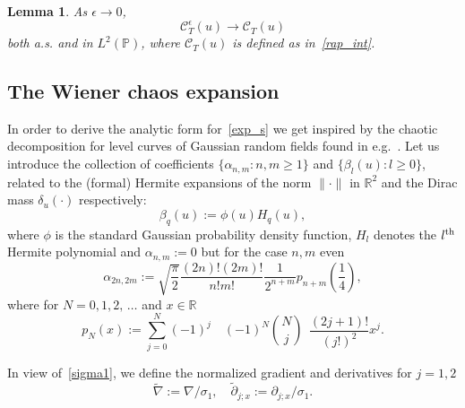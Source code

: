 \documentclass[10pt]{amsart}
\newtheorem{lemm}[theo]{Lemma}\newtheorem{prop}[theo]{Proposition}\newtheorem{coro}[theo]{Corollary}\newtheorem{conj}[theo]{Conjecture}
\theoremstyle{definition}\newtheorem{defi}[theo]{Definition}\newtheorem{rema}[theo]{Remark}\newtheorem{exam}[theo]{Example}\newtheorem{exem}[theo]{Example}\newtheorem{nota}[theo]{Notation}
\newcommand{\clC}{\mathcal{C}}
\newcommand{\bbR}{\mathbb{R}}
\newcommand{\bbP}{\mathbb{P}}
\begin{document}
\begin{lemm}\label{approx}
As $\epsilon\to 0$,
\begin{equation}
\clC_T^\epsilon(u) \to \clC_T(u)
\end{equation}
both a.s. and in $L^2(\bbP)$, where $\clC_T(u)$ is defined as in~\eqref{rap_int}.
\end{lemm}

\subsection{The Wiener chaos expansion}
\label{sec-Wiener}

In order to derive the analytic form for~\eqref{exp_s} we get inspired by the chaotic decomposition for level curves of Gaussian random fields found in e.g.~\cite{KL01, MPRW16}. Let us introduce the collection of coefficients $\{\alpha_{n,m} : n,m\geq 1\}$ and $\{\beta_{l}(u) : l\geq 0\}$, related to the (formal) Hermite expansions of the norm $\| \cdot \|$ in $\bbR^2$ and the Dirac mass $\delta_u(\cdot)$ respectively:
\begin{equation}\label{e:beta}
\beta_{q}(u):= \phi(u)H_{q}(u),
\end{equation}
where $\phi$ is the standard Gaussian probability density function, $H_{l}$ denotes the $l^{\rm th}$ Hermite polynomial and $\alpha_{n,m}:=0$ but for the case $n,m$ even
\begin{equation}\label{e:alpha}
\alpha_{2n,2m}:=\sqrt{\frac{\pi}{2}}\frac{(2n)!(2m)!}{n! m!}\frac{1}{2^{n+m}} p_{n+m}\left(\frac14\right),
\end{equation}
where for $N=0, 1, 2,\,\dots$ and $x\in \bbR$
\begin{equation}\label{pN}
p_{N}(x) :=\sum_{j=0}^{N}(-1)^{j}\quad (-1)^{N}{\binom{N}{j}}\ \ \frac{(2j+1)!}{(j!)^2} x^j.
\end{equation}

In view of~\eqref{sigma1}, we define the normalized gradient and derivatives for $j=1,2$
\begin{equation*}
\widetilde \nabla := \nabla /\sigma_1,\quad \widetilde \partial_{j;x} :=
\partial_{j;x}/\sigma_1.
\end{equation*}
\end{document}

